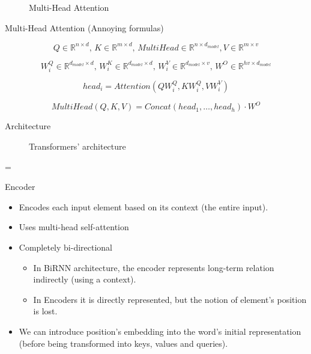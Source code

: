 \documentclass{KBook}
\begin{document}
	\vspace{-6pt}
	\begin{figure}
		\centering
		\vspace{-6pt}
		\caption{Multi-Head Attention \cite{2017-vaswani-al}}
	\end{figure}
	
Multi-Head Attention (Annoying formulas)
	
	\[Q \in \mathbb{R}^{n \times d}, \, K \in \mathbb{R}^{m \times d}, \, MultiHead \in \mathbb{R}^{n \times d_{model}}, V \in \mathbb{R}^{m \times v} \]
	
	\[W^Q_i \in \mathbb{R}^{d_{model} \times d}, \,  W^K_i \in \mathbb{R}^{d_{model} \times d}, \, W^V_i \in \mathbb{R}^{d_{model} \times v}, \, W^O \in \mathbb{R}^{hv \times d_{model}}\]
	
	\[head_i = Attention(Q W^Q_i, K W^Q_i, V W^V_i)\]
	
	\[MultiHead(Q, K, V) = Concat(head_1, \ldots, head_h) \cdot W^O\]
	


Architecture
	
	\begin{minipage}{0.49\textwidth}
		\begin{figure}
			\centering
			\vskip-8pt
			\caption{Transformers' architecture \cite{2017-vaswani-al}}
		\end{figure}
	\end{minipage}
	\begin{minipage}{0.1\textwidth}
		=
	\end{minipage}
	\begin{minipage}{0.39\textwidth}
	\end{minipage}

Encoder
	\begin{itemize}
		\item Encodes each input element based on its context (the entire input).
		\item Uses multi-head self-attention
		\item Completely bi-directional
		\begin{itemize}
			\item In BiRNN architecture, the encoder represents long-term relation indirectly (using a context).
			\item In Encoders it is directly represented, but the notion of element's position is lost.
		\end{itemize} 
		\item We can introduce position's embedding into the word's initial representation (before being transformed into keys, values and queries).
	\end{itemize}
\end{document}
